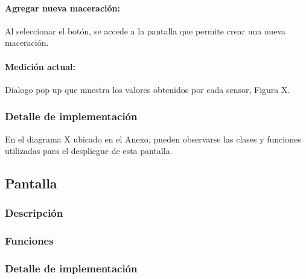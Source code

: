                 \paragraph{Agregar nueva maceración:}
                Al seleccionar el botón, se accede a la pantalla que permite crear una nueva maceración.
                \paragraph{Medición actual:}
                Dialogo pop up que muestra los valores obtenidos por cada sensor, Figura X.
            
            \subsubsection{Detalle de implementación}
                En el diagrama X ubicado en el Anexo, pueden observarse las clases y funciones utilizadas para el despliegue de esta pantalla.
            
        \subsection{Pantalla}
            \subsubsection{Descripción}
            \subsubsection{Funciones}
            \subsubsection{Detalle de implementación}